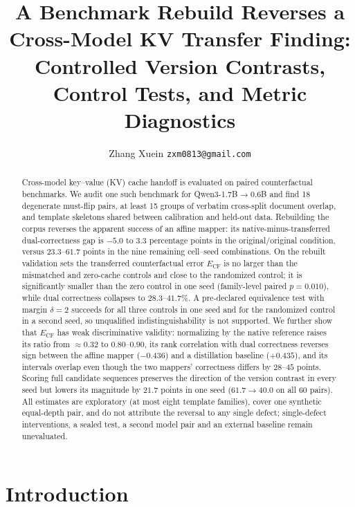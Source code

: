 \documentclass[11pt,a4paper]{article}
\title{A Benchmark Rebuild Reverses a Cross-Model KV Transfer Finding:\\
       Controlled Version Contrasts, Control Tests, and Metric Diagnostics}
\author{Zhang Xuein \texttt{zxm0813@gmail.com}}
\date{}
\begin{document}
\maketitle

\begin{abstract}
Cross-model key--value (KV) cache handoff is evaluated on paired
counterfactual benchmarks. We audit one such benchmark for
Qwen3-1.7B$\to$0.6B and find 18 degenerate must-flip pairs, at least 15 groups
of verbatim cross-split document overlap, and template skeletons shared
between calibration and held-out data. Rebuilding the corpus reverses the
apparent success of an affine mapper: its native-minus-transferred
dual-correctness gap is $-5.0$ to $3.3$ percentage points in the
original/original condition, versus $23.3$--$61.7$ points in the nine remaining
cell--seed combinations. On the rebuilt validation sets the transferred
counterfactual error $E_{\mathrm{CF}}$ is no larger than the mismatched and
zero-cache controls and close to the randomized control; it is significantly smaller than the zero control in
one seed (family-level paired $p=0.010$), while dual correctness collapses to
$28.3$--$41.7\%$. A pre-declared equivalence test with margin $\delta=2$
succeeds for all three controls in one seed and for the randomized control in a
second seed, so unqualified indistinguishability is not supported. We further
show that $E_{\mathrm{CF}}$ has weak discriminative validity: normalizing by
the native reference raises its ratio from $\approx0.32$ to $0.80$--$0.90$, its
rank correlation with dual correctness reverses sign between the affine mapper
($-0.436$) and a distillation baseline ($+0.435$), and its intervals overlap
even though the two mappers' correctness differs by $28$--$45$ points. Scoring
full candidate sequences preserves the direction of the version contrast in
every seed but lowers its magnitude by $21.7$ points in one seed
($61.7\to40.0$ on all 60 pairs). All estimates are exploratory (at most eight
template families), cover one synthetic equal-depth pair, and do not attribute
the reversal to any single defect; single-defect interventions, a sealed test,
a second model pair and an external baseline remain unevaluated.
\end{abstract}

\section{Introduction}
\label{sec:intro}
\end{document}
